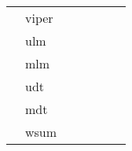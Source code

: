 \begin{table}[]
{\begin{tabular}{lllllll}
\multicolumn{1}{c}{}                                                                         & viper              &                                                                                   &                                                                             &                                                                                 &                                                                          &                               \\
\multicolumn{1}{c}{}                                                                         & ulm                &                                                                                   &                                                                             &                                                                                 &                                                                          &                               \\
\multicolumn{1}{c}{}                                                                         & mlm                &                                                                                   &                                                                             &                                                                                 &                                                                          &                               \\
\multicolumn{1}{c}{}                                                                         & udt                &                                                                                   &                                                                             &                                                                                 &                                                                          &                               \\
\multicolumn{1}{c}{}                                                                         & mdt                &                                                                                   &                                                                             &                                                                                 &                                                                          &                               \\
\multicolumn{1}{c}{}                                                                         & wsum               &                                                                                   &                                                                             &                                                                                 &                                                                          &                               \\

\end{tabular}}
\end{table}
